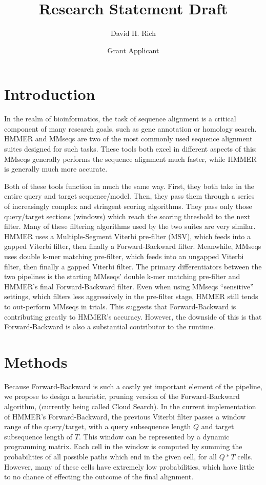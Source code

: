 \documentclass{article}
\title{Research Statement Draft}
\author{David H. Rich}
\date{Grant Applicant}
\begin{document}
	\maketitle%
	\thispagestyle{empty}
	\vspace{16pt}
	
	\section{Introduction}
	
	In the realm of bioinformatics, the task of sequence alignment is a critical component of many research goals, such as gene annotation or homology search.  HMMER and MMseqs are two of the most commonly used sequence alignment suites designed for such tasks.  These tools both excel in different aspects of this: MMseqs generally performs the sequence alignment much faster, while HMMER is generally much more accurate.  
	
	Both of these tools function in much the same way.  First, they both take in the entire query and target sequence/model. Then, they pass them through a series of increasingly complex and stringent scoring algorithms. They pass only those query/target sections (windows) which reach the scoring threshold to the next filter.  Many of these filtering algorithms used by the two suites are very similar.  HMMER uses a Multiple-Segment Viterbi pre-filter (MSV), which feeds into a gapped Viterbi filter, then finally a Forward-Backward filter.  Meanwhile, MMseqs uses double k-mer matching pre-filter, which feeds into an ungapped Viterbi filter, then finally a gapped Viterbi filter.  The primary differentiators between the two pipelines is the starting MMseqs’ double k-mer matching pre-filter and HMMER’s final Forward-Backward filter.  Even when using MMseqs “sensitive” settings, which filters less aggressively in the pre-filter stage, HMMER still tends to out-perform MMseqs in trials.  This suggests that Forward-Backward is contributing greatly to HMMER’s accuracy.  However, the downside of this is that Forward-Backward is also a substantial contributor to the runtime.
	
	
	\section{Methods}
	
	Because Forward-Backward is such a costly yet important element of the pipeline, we propose to design a heuristic, pruning version of the Forward-Backward algorithm, (currently being called Cloud Search).  In the current implementation of HMMER’s Forward-Backward, the previous Viterbi filter passes a window range of the query/target, with a query subsequence length $Q$ and target subsequence length of $T$.  This window can be represented by a dynamic programming matrix.  Each cell in the window is computed by summing the probabilities of all possible paths which end in the given cell, for all $Q * T$ cells.  However, many of these cells have extremely low probabilities, which have little to no chance of effecting the outcome of the final alignment.  
	
\end{document}
